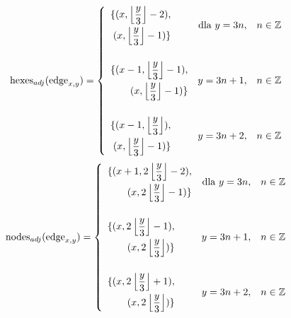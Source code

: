 \documentclass[11pt,twoside]{report}
\begin{document}
\begin{equation}
  \text{hexes}_{adj}(\text{edge}_{x,y})=
  \left\{
    \begin{array}{l r l}
      \begin{aligned}
        \{
        (x, \left\lfloor\frac{y}{3}\right\rfloor-2), \\
        (x, \left\lfloor\frac{y}{3}\right\rfloor-1)
        \}
      \end{aligned} & \mbox{dla } y=3n, & n\in\mathbb{Z} \\[30pt]
      \begin{aligned}
        \{
        (x-1, \left\lfloor\frac{y}{3}\right\rfloor-1), \\
        (x, \left\lfloor\frac{y}{3}\right\rfloor-1)
        \}
      \end{aligned} & y=3n+1, & n\in\mathbb{Z} \\[30pt]
      \begin{aligned}
      \{
      (x-1, \left\lfloor\frac{y}{3}\right\rfloor), \\
      (x, \left\lfloor\frac{y}{3}\right\rfloor-1)
      \}
      \end{aligned} & y=3n+2, & n\in\mathbb{Z} \\
    \end{array} \right.
  \label{edgehexes}
\end{equation}
\begin{equation}
  \text{nodes}_{adj}(\text{edge}_{x,y})=
  \left\{
    \begin{array}{l r l}
      \begin{aligned}
      \{
      (x+1, 2\left\lfloor\frac{y}{3}\right\rfloor-2), \\
      (x, 2\left\lfloor\frac{y}{3}\right\rfloor-1)
      \}
      \end{aligned} & \mbox{dla } y=3n, & n\in\mathbb{Z} \\[30pt]
      \begin{aligned}
        \{
        (x, 2\left\lfloor\frac{y}{3}\right\rfloor-1), \\
        (x, 2\left\lfloor\frac{y}{3}\right\rfloor)
        \}
      \end{aligned} & y=3n+1, & n\in\mathbb{Z} \\[30pt]
      \begin{aligned}
      \{
      (x, 2\left\lfloor\frac{y}{3}\right\rfloor+1), \\
      (x, 2\left\lfloor\frac{y}{3}\right\rfloor)
      \}
      \end{aligned} & y=3n+2, & n\in\mathbb{Z} \\
    \end{array} \right.
  \label{edgenodes}
\end{equation}
\end{document}
